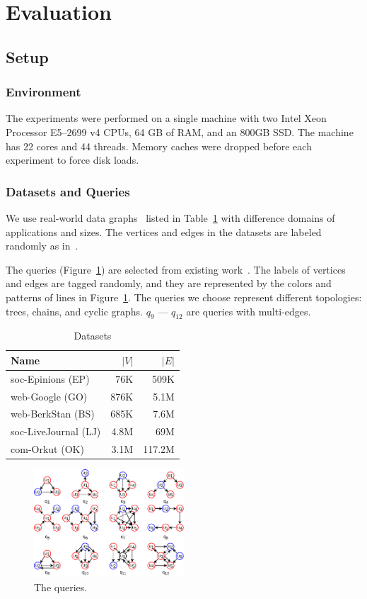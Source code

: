 \section{Evaluation}\label{sec:experiments}
\subsection{Setup}
\subsubsection{Environment}
The experiments were performed on a single machine with two Intel Xeon Processor E5--2699 v4 CPUs, 64 GB of RAM,
and an 800GB SSD\@.
The machine has 22 cores and 44 threads.
Memory caches were dropped before each experiment to force disk loads.
\subsubsection{Datasets and Queries}
We use real-world data graphs~\cite{snapnets} listed in Table~\ref{tab:datasets} with difference domains of applications and sizes.
The vertices and edges in the datasets are labeled randomly as in~\cite{DBLP:journals/pvldb/MhedhbiS19}.

The queries (Figure~\ref{img:queries}) are selected from existing work~\cite{DBLP:conf/cloud/SerafiniMS17,DBLP:journals/pvldb/MhedhbiS19}.
The labels of vertices and edges are tagged randomly,
and they are represented by the colors and patterns of lines in Figure~\ref{img:queries}.
The queries we choose represent different topologies: trees, chains, and cyclic graphs.
$q_9$ --- $q_{12}$ are queries with multi-edges.
\begin{table}
  \caption{Datasets}\label{tab:datasets}
  \begin{tabular}{lrr}
    \toprule
    Name & $|V|$ & $|E|$ \\
    \midrule
    soc-Epinions (EP) & 76K & 509K \\
    web-Google (GO) & 876K & 5.1M \\
    web-BerkStan (BS) & 685K & 7.6M \\
    soc-LiveJournal (LJ) & 4.8M & 69M \\
    com-Orkut (OK) & 3.1M & 117.2M \\
    \bottomrule
  \end{tabular}
\end{table}

\begin{figure}[ht]
  \centering
  \includegraphics[width=0.5\textwidth]{img/queries.pdf}
  \caption{The queries.}\label{img:queries}
\end{figure}

